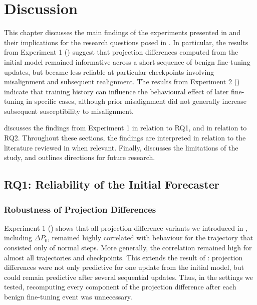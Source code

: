 \chapter{Discussion}
\label{ch:discussion}
This chapter discusses the main findings of the experiments presented in  and their implications for the research questions posed in . In particular, the results from Experiment 1 () suggest that projection differences computed from the initial model remained informative across a short sequence of benign fine-tuning updates, but became less reliable at particular checkpoints involving misalignment and subsequent realignment. The results from Experiment 2 () indicate that training history can influence the behavioural effect of later fine-tuning in specific cases, although prior misalignment did not generally increase subsequent susceptibility to misalignment.

 discusses the findings from Experiment 1 in relation to RQ1, and  in relation to RQ2. Throughout these sections, the findings are interpreted in relation to the literature reviewed in  when relevant. Finally,  discusses the limitations of the study, and  outlines directions for future research.

\section{RQ1: Reliability of the Initial Forecaster}
\label{sec:discussion-rq1}

\subsection{Robustness of Projection Differences}
Experiment 1 () shows that all projection-difference variants we introduced in , including $\Delta P_0$, remained highly correlated with behaviour for the trajectory that consisted only of normal steps. More generally, the correlation remained high for almost all trajectories and checkpoints. This extends the result of \citet{chen2025persona_vectors}: projection differences were not only predictive for one update from the initial model, but could remain predictive after several sequential updates. Thus, in the settings we tested, recomputing every component of the projection difference after each benign fine-tuning event was unnecessary.

